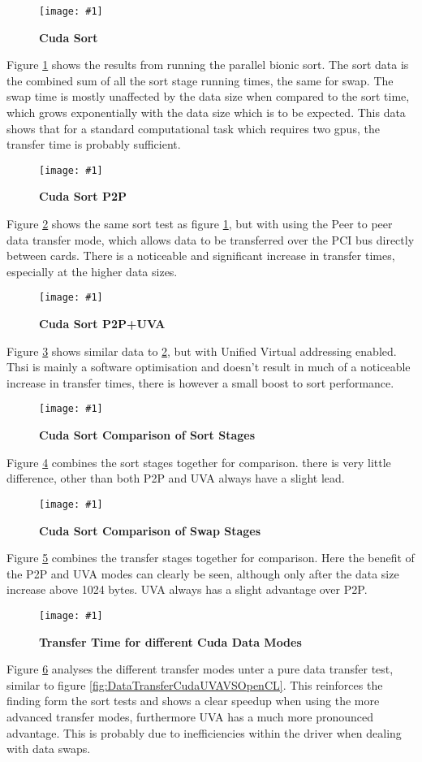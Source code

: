 \documentclass[12pt,a4paper]{article}
\newcommand{\figuremacroWHHN}[3]{
	\begin{figure}[H] %
		\centering
		\texttt{[image: \#1]}
		\caption[#2]{\textbf{#2}}
		\label{fig:#1}
	\end{figure}
}
\begin{document}
\figuremacroWHHN
{TeslaCudaSortStandard}
{Cuda Sort}
{1.0}

Figure \ref{fig:TeslaCudaSortStandard} shows the results from running the parallel bionic sort. The sort data is the combined sum of all the sort stage running times, the same for swap. 
The swap time is mostly unaffected by the data size when compared to the sort time, which grows exponentially with the data size which is to be expected. 
This data shows that for a standard computational task which requires two gpus, the transfer time is probably sufficient. 

\figuremacroWHHN
{TeslaCudaSortP2P}
{Cuda Sort P2P}
{1.0}

Figure \ref{fig:TeslaCudaSortP2P} shows the same sort test as figure \ref{fig:TeslaCudaSortStandard}, but with using the Peer to peer data transfer mode, which allows data to be transferred over the PCI bus directly between cards.
There is a noticeable and significant increase in transfer times, especially at the higher data sizes.
\clearpage
\figuremacroWHHN
{TeslaCudaSortP2PUVA}
{Cuda Sort P2P+UVA}
{1.0}

Figure \ref{fig:TeslaCudaSortP2PUVA} shows similar data to  \ref{fig:TeslaCudaSortP2P}, but with Unified Virtual addressing enabled. Thsi is mainly a software optimisation and doesn't result in much of a noticeable increase in transfer times, there is however a small boost to sort performance.
\clearpage

\figuremacroWHHN
{TeslaCudaSortSortStages}
{Cuda Sort Comparison of Sort Stages}
{1.0}

Figure \ref{fig:TeslaCudaSortSortStages} combines the sort stages together for comparison. there is very little difference, other than both P2P and UVA always have a slight lead.

\figuremacroWHHN
{TeslaCudaSortSwapStages}
{Cuda Sort Comparison of Swap Stages}
{1.0}

Figure \ref{fig:TeslaCudaSortSwapStages} combines the transfer stages together for comparison. Here the benefit of the P2P and UVA modes can clearly be seen, although only after the data size increase above 1024 bytes.
UVA always has a slight advantage over P2P.

\figuremacroWHHN
{CUDADataTransfer}
{Transfer Time for different Cuda Data Modes}
{1.0}

Figure \ref{fig:CUDADataTransfer} analyses the different transfer modes unter a pure data transfer test, similar to figure \ref{fig:DataTransferCudaUVAVSOpenCL}. This reinforces the finding form the sort tests and shows a clear speedup when using the more advanced transfer modes, furthermore UVA has a much more pronounced advantage. This is probably due to inefficiencies within the driver when dealing with data swaps.
\end{document}
